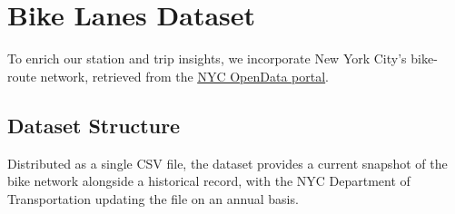 \section{Bike Lanes Dataset}
To enrich our station and trip insights, we incorporate New York City's bike-route network, retrieved from the \href{https://data.cityofnewyork.us/Transportation/New-York-City-Bike-Routes/mzxg-pwib}{\underline{NYC OpenData portal}}.

\subsection{Dataset Structure}
Distributed as a single CSV file, the dataset provides a current snapshot of the bike network alongside a historical record, with the NYC Department of Transportation updating the file on an annual basis.

